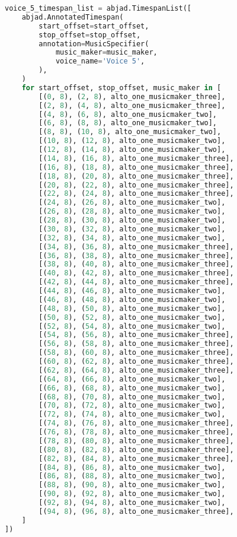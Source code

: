 \begin{lstlisting}[language=Python, caption=Invocation Source Code]
voice_5_timespan_list = abjad.TimespanList([
    abjad.AnnotatedTimespan(
        start_offset=start_offset,
        stop_offset=stop_offset,
        annotation=MusicSpecifier(
            music_maker=music_maker,
            voice_name='Voice 5',
        ),
    )
    for start_offset, stop_offset, music_maker in [
        [(0, 8), (2, 8), alto_one_musicmaker_three],
        [(2, 8), (4, 8), alto_one_musicmaker_three],
        [(4, 8), (6, 8), alto_one_musicmaker_two],
        [(6, 8), (8, 8), alto_one_musicmaker_two],
        [(8, 8), (10, 8), alto_one_musicmaker_two],
        [(10, 8), (12, 8), alto_one_musicmaker_two],
        [(12, 8), (14, 8), alto_one_musicmaker_two],
        [(14, 8), (16, 8), alto_one_musicmaker_three],
        [(16, 8), (18, 8), alto_one_musicmaker_three],
        [(18, 8), (20, 8), alto_one_musicmaker_three],
        [(20, 8), (22, 8), alto_one_musicmaker_three],
        [(22, 8), (24, 8), alto_one_musicmaker_three],
        [(24, 8), (26, 8), alto_one_musicmaker_two],
        [(26, 8), (28, 8), alto_one_musicmaker_two],
        [(28, 8), (30, 8), alto_one_musicmaker_two],
        [(30, 8), (32, 8), alto_one_musicmaker_two],
        [(32, 8), (34, 8), alto_one_musicmaker_two],
        [(34, 8), (36, 8), alto_one_musicmaker_three],
        [(36, 8), (38, 8), alto_one_musicmaker_three],
        [(38, 8), (40, 8), alto_one_musicmaker_three],
        [(40, 8), (42, 8), alto_one_musicmaker_three],
        [(42, 8), (44, 8), alto_one_musicmaker_three],
        [(44, 8), (46, 8), alto_one_musicmaker_two],
        [(46, 8), (48, 8), alto_one_musicmaker_two],
        [(48, 8), (50, 8), alto_one_musicmaker_two],
        [(50, 8), (52, 8), alto_one_musicmaker_two],
        [(52, 8), (54, 8), alto_one_musicmaker_two],
        [(54, 8), (56, 8), alto_one_musicmaker_three],
        [(56, 8), (58, 8), alto_one_musicmaker_three],
        [(58, 8), (60, 8), alto_one_musicmaker_three],
        [(60, 8), (62, 8), alto_one_musicmaker_three],
        [(62, 8), (64, 8), alto_one_musicmaker_three],
        [(64, 8), (66, 8), alto_one_musicmaker_two],
        [(66, 8), (68, 8), alto_one_musicmaker_two],
        [(68, 8), (70, 8), alto_one_musicmaker_two],
        [(70, 8), (72, 8), alto_one_musicmaker_two],
        [(72, 8), (74, 8), alto_one_musicmaker_two],
        [(74, 8), (76, 8), alto_one_musicmaker_three],
        [(76, 8), (78, 8), alto_one_musicmaker_three],
        [(78, 8), (80, 8), alto_one_musicmaker_three],
        [(80, 8), (82, 8), alto_one_musicmaker_three],
        [(82, 8), (84, 8), alto_one_musicmaker_three],
        [(84, 8), (86, 8), alto_one_musicmaker_two],
        [(86, 8), (88, 8), alto_one_musicmaker_two],
        [(88, 8), (90, 8), alto_one_musicmaker_two],
        [(90, 8), (92, 8), alto_one_musicmaker_two],
        [(92, 8), (94, 8), alto_one_musicmaker_two],
        [(94, 8), (96, 8), alto_one_musicmaker_three],
    ]
])


\end{lstlisting}
